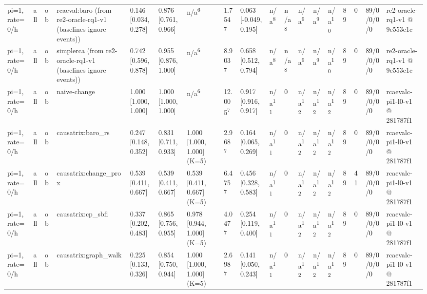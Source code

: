 \begin{table}[t]
\begin{tabular}{llllllllllllllllll}
pi=1, rate=0/h & all & ob & rcaeval:baro (from re2-oracle-rq1-v1 (baselines ignore events)) & 0.146 [0.034, 0.278] & 0.876 [0.761, 0.966] & n/a\textsuperscript{6} & 1.754\textsuperscript{7} & 0.063 [-0.049, 0.195] & n/a\textsuperscript{8} & n/a\textsuperscript{8} & n/a\textsuperscript{9} & n/a\textsuperscript{9} & n/a\textsuperscript{10} & 89 & 0 & 89/0/0/0/0 & re2-oracle-rq1-v1 @ 9e553e1c \\
pi=1, rate=0/h & all & ob & simplerca (from re2-oracle-rq1-v1 (baselines ignore events)) & 0.742 [0.596, 0.878] & 0.955 [0.876, 1.000] & n/a\textsuperscript{6} & 8.903\textsuperscript{7} & 0.658 [0.512, 0.794] & n/a\textsuperscript{8} & n/a\textsuperscript{8} & n/a\textsuperscript{9} & n/a\textsuperscript{9} & n/a\textsuperscript{10} & 89 & 0 & 89/0/0/0/0 & re2-oracle-rq1-v1 @ 9e553e1c \\
pi=1, rate=0/h & all & ob & naive-change & 1.000 [1.000, 1.000] & 1.000 [1.000, 1.000] & n/a\textsuperscript{6} & 12.005\textsuperscript{7} & 0.917 [0.916, 0.917] & n/a\textsuperscript{11} & 0 & n/a\textsuperscript{12} & n/a\textsuperscript{12} & n/a\textsuperscript{12} & 89 & 0 & 89/0/0/0/0 & rcaevalc-pi1-l0-v1 @ 281787f1 \\
pi=1, rate=0/h & all & ob & causatrix:baro\_rs & 0.247 [0.148, 0.352] & 0.831 [0.711, 0.933] & 1.000 [1.000, 1.000] (K=5) & 2.968\textsuperscript{7} & 0.164 [0.065, 0.269] & n/a\textsuperscript{11} & 0 & n/a\textsuperscript{12} & n/a\textsuperscript{12} & n/a\textsuperscript{12} & 89 & 0 & 89/0/0/0/0 & rcaevalc-pi1-l0-v1 @ 281787f1 \\
pi=1, rate=0/h & all & ob & causatrix:change\_prox & 0.539 [0.411, 0.667] & 0.539 [0.411, 0.667] & 0.539 [0.411, 0.667] (K=5) & 6.475\textsuperscript{7} & 0.456 [0.328, 0.583] & n/a\textsuperscript{11} & 0 & n/a\textsuperscript{12} & n/a\textsuperscript{12} & n/a\textsuperscript{12} & 89 & 41 & 89/0/0/0/0 & rcaevalc-pi1-l0-v1 @ 281787f1 \\
pi=1, rate=0/h & all & ob & causatrix:cp\_sbfl & 0.337 [0.202, 0.483] & 0.865 [0.756, 0.955] & 0.978 [0.944, 1.000] (K=5) & 4.047\textsuperscript{7} & 0.254 [0.119, 0.400] & n/a\textsuperscript{11} & 0 & n/a\textsuperscript{12} & n/a\textsuperscript{12} & n/a\textsuperscript{12} & 89 & 0 & 89/0/0/0/0 & rcaevalc-pi1-l0-v1 @ 281787f1 \\
pi=1, rate=0/h & all & ob & causatrix:graph\_walk & 0.225 [0.133, 0.326] & 0.854 [0.750, 0.944] & 1.000 [1.000, 1.000] (K=5) & 2.698\textsuperscript{7} & 0.141 [0.050, 0.243] & n/a\textsuperscript{11} & 0 & n/a\textsuperscript{12} & n/a\textsuperscript{12} & n/a\textsuperscript{12} & 89 & 0 & 89/0/0/0/0 & rcaevalc-pi1-l0-v1 @ 281787f1 \\

\end{tabular}
\end{table}
